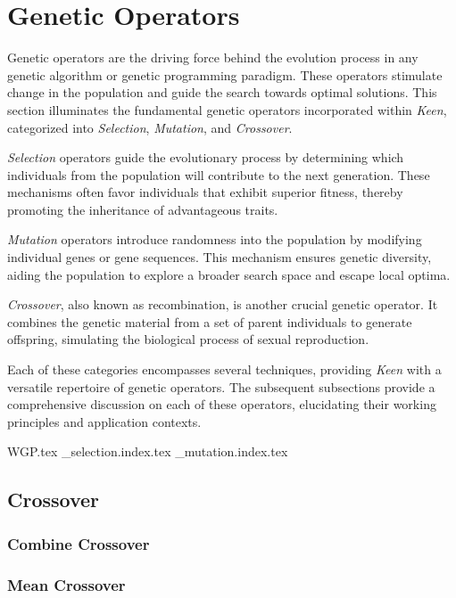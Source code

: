 
\section{Genetic Operators}
\label{sec:keen:operators}
  Genetic operators are the driving force behind the evolution process in any
  genetic algorithm or genetic programming paradigm.
  These operators stimulate change in the population and guide the search
  towards optimal solutions.
  This section illuminates the fundamental genetic operators incorporated within
  \textit{Keen}, categorized into \textit{Selection}, \textit{Mutation}, and
  \textit{Crossover}.

  \textit{Selection} operators guide the evolutionary process by determining
  which individuals from the population will contribute to the next generation.
  These mechanisms often favor individuals that exhibit superior fitness, 
  thereby promoting the inheritance of advantageous traits.

  \textit{Mutation} operators introduce randomness into the population by 
  modifying individual genes or gene sequences.
  This mechanism ensures genetic diversity, aiding the population to explore a 
  broader search space and escape local optima.

  \textit{Crossover}, also known as recombination, is another crucial genetic 
  operator.
  It combines the genetic material from a set of parent individuals to generate
  offspring, simulating the biological process of sexual reproduction.

  Each of these categories encompasses several techniques, providing
  \textit{Keen} with a versatile repertoire of genetic operators.
  The subsequent subsections provide a comprehensive discussion on each of these
  operators, elucidating their working principles and application contexts.

  {WGP.tex}
  {_selection.index.tex}
  {_mutation.index.tex}
  \subsection{Crossover}
  \label{sec:keen:operators:crossover}
    \subsubsection{Combine Crossover}
    \label{sec:keen:operators:crossover:combine}
      \Blindtext
    \subsubsection{Mean Crossover}
    \label{sec:keen:operators:crossover:mean}
      \Blindtext
